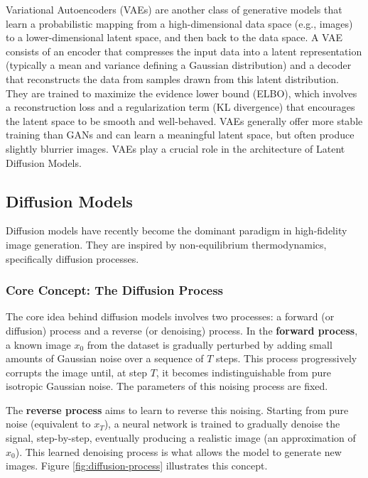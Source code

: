 Variational Autoencoders (VAEs) \cite{vae} are another class of generative models that learn a probabilistic mapping from a high-dimensional data space (e.g., images) to a lower-dimensional latent space, and then back to the data space. A VAE consists of an encoder that compresses the input data into a latent representation (typically a mean and variance defining a Gaussian distribution) and a decoder that reconstructs the data from samples drawn from this latent distribution. They are trained to maximize the evidence lower bound (ELBO), which involves a reconstruction loss and a regularization term (KL divergence) that encourages the latent space to be smooth and well-behaved. VAEs generally offer more stable training than GANs and can learn a meaningful latent space, but often produce slightly blurrier images. VAEs play a crucial role in the architecture of Latent Diffusion Models.

\subsection{Diffusion Models}
Diffusion models have recently become the dominant paradigm in high-fidelity image generation. They are inspired by non-equilibrium thermodynamics, specifically diffusion processes.

\subsubsection{Core Concept: The Diffusion Process}
The core idea behind diffusion models involves two processes: a forward (or diffusion) process and a reverse (or denoising) process.
In the \textbf{forward process}, a known image $x_0$ from the dataset is gradually perturbed by adding small amounts of Gaussian noise over a sequence of $T$ steps. This process progressively corrupts the image until, at step $T$, it becomes indistinguishable from pure isotropic Gaussian noise. The parameters of this noising process are fixed.

The \textbf{reverse process} aims to learn to reverse this noising. Starting from pure noise (equivalent to $x_T$), a neural network is trained to gradually denoise the signal, step-by-step, eventually producing a realistic image (an approximation of $x_0$). This learned denoising process is what allows the model to generate new images. Figure \ref{fig:diffusion-process} illustrates this concept.

